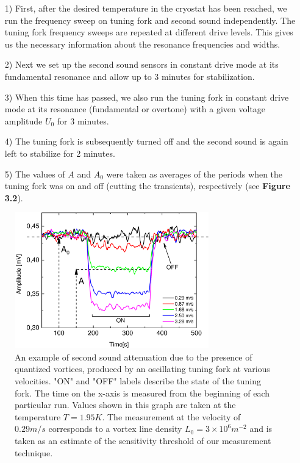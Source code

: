 \begin{itemize}
	\item[1)] First, after the desired temperature in the cryostat has been reached, we run the frequency sweep on tuning fork and second sound independently. The tuning fork frequency sweeps are repeated at different drive levels. This gives us the necessary information about the resonance frequencies and widths.

	\item[2)] Next we set up the second sound sensors in constant drive mode at its fundamental resonance and allow up to 3 minutes for stabilization.

	\item[3)] When this time has passed, we also run the tuning fork in constant drive mode at its resonance (fundamental or overtone) with a given voltage amplitude $ U_0 $ for 3 minutes.

	\item[4)] The tuning fork is subsequently turned off and the second sound is again left to stabilize for 2 minutes.

	\item[5)] The values of $ A $ and $ A_0 $ were taken as averages of the periods when the tuning fork was on and off (cutting the transients), respectively (see {\sffamily\textbf{Figure 3.2}}).
\end{itemize}


\begin{figure}[h!]
\centering
\includegraphics[width=0.75\textwidth]{graphs/Attenuation.pdf}
\caption{An example of second sound attenuation due to the presence of quantized vortices, produced by an oscillating tuning fork at various velocities. "ON" and "OFF" labels describe the state of the tuning fork. The time on the x-axis is measured from the beginning  of each particular run. Values shown in this graph are taken at the temperature $ T=1.95\unit{K} $. The measurement at the velocity of $0.29\unit{m/s}$ corresponds to a vortex line density $L_0 = 3 \times 10^6 \unit{m}^{-2}$ and is taken as an estimate of the sensitivity threshold of our measurement technique.}
\end{figure}

